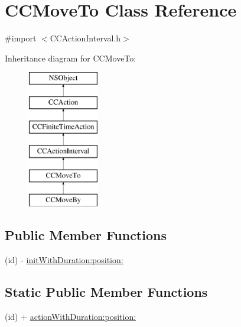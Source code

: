 \hypertarget{interface_c_c_move_to}{\section{C\-C\-Move\-To Class Reference}
\label{interface_c_c_move_to}
}


{\ttfamily \#import $<$C\-C\-Action\-Interval.\-h$>$}

Inheritance diagram for C\-C\-Move\-To\-:\begin{figure}[H]
\begin{center}
\leavevmode
\includegraphics[height=6.000000cm]{interface_c_c_move_to}
\end{center}
\end{figure}
\subsection*{Public Member Functions}
\begin{DoxyCompactItemize}
\item 
(id) -\/ \hyperlink{interface_c_c_move_to_a4f3d21350e8ef39c4ba8b9cff21e240b}{init\-With\-Duration\-:position\-:}
\end{DoxyCompactItemize}
\subsection*{Static Public Member Functions}
\begin{DoxyCompactItemize}
\item 
(id) + \hyperlink{interface_c_c_move_to_ac3317aacb1b5c544b9dc8875afa9f3e7}{action\-With\-Duration\-:position\-:}
\end{DoxyCompactItemize}
